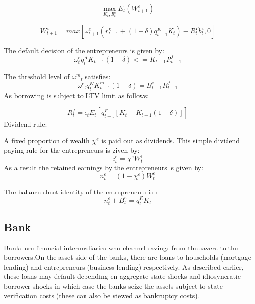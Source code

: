 \documentclass[12pt]{article}
\numberwithin{equation}{section}
\begin{document}
\begin{appendix}
\begin{equation}
\max_{K_t,B^e_t}E_t(W^e_{t+1})
\end{equation}	


\begin{equation}
W^e_{t+1}=max[\omega^e_{t+1}(r^k_{t+1}+(1-\delta)q^K_{t+1}K_{t})-R^F_{t}b^e_{t},0]
\end{equation}


The default decision of the entrepreneurs is given by:
\begin{equation}
{{\omega^e_{t} }}q^H_{t} K_{t-1}(1-\delta) <= K_{t-1}R^f_{t-1}
\end{equation}

The threshold level of $\bar{\omega^m}_t$ satisfies:
\begin{equation}
\bar{\omega^e}_t q^K_{t} K^m_{t-1}(1-\delta) = B^e_{t-1}R^f_{t-1}
\end{equation}
As borrowing is subject to LTV limit as follows:

\begin{equation}
[B^e_t-B^e_{t-1}(1-rp)]R^f_{t} =\epsilon_{t} E_t[q^F_{t+1} [K_t-K_{t-1}(1-\delta)]]
\end{equation}
Dividend rule:

A fixed proportion of wealth $\chi^e$ is paid out as dividends. This simple dividend paying rule for the entrepreneurs is given by:
\begin{equation}
c^e_t=\chi^e W^e_t
\end{equation}
As a result the retained earnings by the entrepreneurs is given by:
\begin{equation}
n^e_t=(1-\chi^e) W^e_t
\end{equation}

The balance sheet identity of the entrepreneurs is :
\begin{equation}
n^e_t+B^e_t=q^K_t K_t
\end{equation}

\subsection*{Bank}

Banks are financial intermediaries who channel savings from the savers to the borrowers.On the asset side of the banks, there are loans to households (mortgage lending) and entrepreneurs (business lending) respectively. As described earlier, these loans may default depending on aggregate state shocks and idiosyncratic borrower shocks in which case the banks seize the assets subject to state verification costs (these can also be viewed as bankruptcy costs).


\end{appendix}
\end{document}
